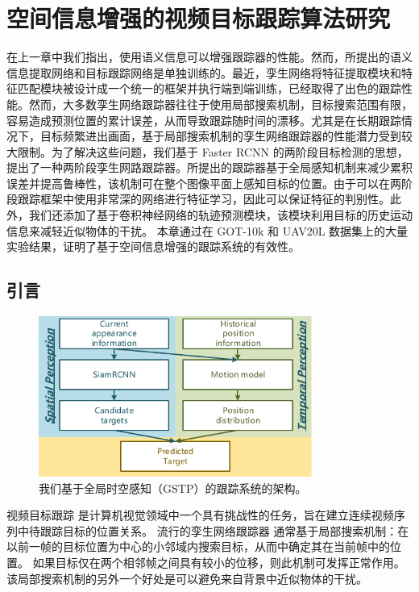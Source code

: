 \chapter{空间信息增强的视频目标跟踪算法研究}\label{chap:globally}
在上一章中我们指出，使用语义信息可以增强跟踪器的性能。然而，所提出的语义信息提取网络和目标跟踪网络是单独训练的。最近，孪生网络将特征提取模块和特征匹配模块被设计成一个统一的框架并执行端到端训练，已经取得了出色的跟踪性能。然而，大多数孪生网络跟踪器往往于使用局部搜索机制，目标搜索范围有限，容易造成预测位置的累计误差，从而导致跟踪随时间的漂移。尤其是在长期跟踪情况下，目标频繁进出画面，基于局部搜索机制的孪生网络跟踪器的性能潜力受到较大限制。为了解决这些问题，我们基于 Faster RCNN \cite{ren2015faster} 的两阶段目标检测的思想，提出了一种两阶段孪生网路跟踪器。所提出的跟踪器基于全局感知机制来减少累积误差并提高鲁棒性，该机制可在整个图像平面上感知目标的位置。由于可以在两阶段跟踪框架中使用非常深的网络进行特征学习，因此可以保证特征的判别性。此外，我们还添加了基于卷积神经网络的轨迹预测模块，该模块利用目标的历史运动信息来减轻近似物体的干扰。
本章通过在 GOT-10k \cite{GOT-10k} 和 UAV20L \cite{mueller2016benchmark} 数据集上的大量实验结果，证明了基于空间信息增强的跟踪系统的有效性。

\section{引言}

\begin{figure}[t]
	\centering
    \includegraphics[width=0.8\textwidth]{Img/globally/Arch7.pdf}
    \caption{我们基于全局时空感知（GSTP）的跟踪系统的架构。}
\end{figure}

视频目标跟踪 \cite{Leang2018OnlineFO, Wang2019VisualOT, Zhang2018UsingFL} 是计算机视觉领域中一个具有挑战性的任务，旨在建立连续视频序列中待跟踪目标的位置关系。
流行的孪生网络跟踪器 \cite{SiamFC, SiamRPN, Wang2018SiamMask} 通常基于局部搜索机制：在以前一帧的目标位置为中心的小邻域内搜索目标，从而中确定其在当前帧中的位置。
如果目标仅在两个相邻帧之间具有较小的位移，则此机制可发挥正常作用。该局部搜索机制的另外一个好处是可以避免来自背景中近似物体的干扰。

